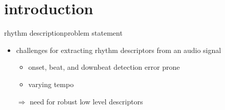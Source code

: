     \section[intro]{introduction}
        \begin{frame}{rhythm description}{problem statement}
            \begin{itemize}
                \item challenges for extracting rhythm descriptors from an audio signal 
                    \begin{itemize}
                        \item   onset, beat, and downbeat detection error prone
                        \item   varying tempo
                    \end{itemize}
                \bigskip
                \item[$\Rightarrow$]   need for robust low level descriptors
            \end{itemize}
        \end{frame}
        
